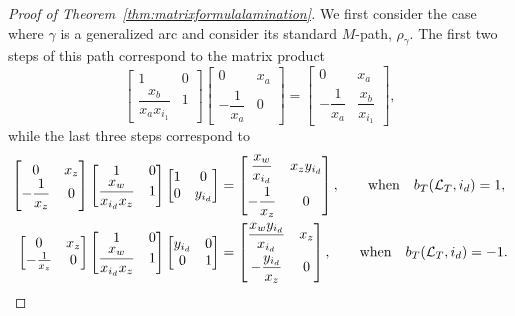 \documentclass[10pt,a4paper]{amsart}
\numberwithin{equation}{section}
\theoremstyle{definition}
\begin{document}
\begin{proof}[Proof of Theorem~\ref{thm:matrixformulalamination}]
 We first consider the case where $\gamma$ is a generalized arc and consider its standard $M$-path, $\rho_{\gamma}$. The first two steps of this path correspond to the matrix product
 \[\begin{bmatrix}
 1 & 0\\
 \dfrac{x_b}{x_a x_{i_1}} & 1
 \end{bmatrix}
 \begin{bmatrix}
 0 & x_a\\
 -\dfrac{1}{x_a} & 0
 \end{bmatrix}=
 \begin{bmatrix}
 0 & x_a\\
 -\dfrac{1}{x_a} & \dfrac{x_b}{x_{i_1}}
 \end{bmatrix},\]
 while the last three steps correspond to
\begin{align*}
\begin{bmatrix}
 0 & x_z\\
 -\dfrac{1}{x_z} & 0
 \end{bmatrix}
 \begin{bmatrix}
 1 & 0\\
 \dfrac{x_w}{x_{i_d} x_z} & 1
 \end{bmatrix}
 \begin{bmatrix}
 1 & 0\\
 0 & y_{i_d}
 \end{bmatrix}&=
 \begin{bmatrix}
 \dfrac{x_w}{x_{i_d}} & x_z y_{i_d}\vspace{1mm}\\
 -\dfrac{1}{x_z} & 0
 \end{bmatrix}, \qquad\text{when}\quad b_T(\mathcal{L}_T, i_d)=1,\\
\begin{bmatrix}
 0 & x_z\\
 -\frac{1}{x_z} & 0
 \end{bmatrix}
 \begin{bmatrix}
 1 & 0\\
 \dfrac{x_w}{x_{i_d} x_z} & 1
 \end{bmatrix}
 \begin{bmatrix}
 y_{i_d} & 0\\
 0 & 1
 \end{bmatrix}&=
 \begin{bmatrix}
 \dfrac{x_w y_{i_d}}{x_{i_d}} & x_z\vspace{1mm}\\
 -\dfrac{y_{i_d}}{x_z} & 0
 \end{bmatrix},\qquad \text{when}\quad b_T(\mathcal{L}_T, i_d)=-1.
\end{align*}


\end{proof}
\end{document}
